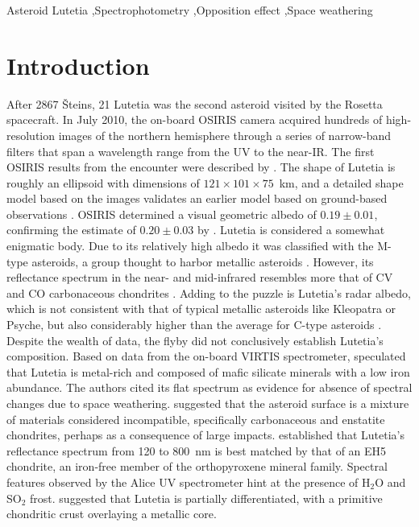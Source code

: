 \documentclass[3p,authoryear]{elsarticle}
\begin{document}
\begin{frontmatter}
\begin{abstract}
\end{abstract}

\begin{keyword}
Asteroid Lutetia \sep Spectrophotometry \sep Opposition effect \sep Space weathering
\end{keyword}

\end{frontmatter}




\section{Introduction}
\label{sec:introduction}

After 2867 {\v S}teins, 21 Lutetia was the second asteroid visited by the Rosetta spacecraft. In July 2010, the on-board OSIRIS camera \citep{K07} acquired hundreds of high-resolution images of the northern hemisphere through a series of narrow-band filters that span a wavelength range from the UV to the near-IR. The first OSIRIS results from the encounter were described by \citet{S11}. The shape of Lutetia is roughly an ellipsoid with dimensions of $121 \times 101 \times 75$~km, and a detailed shape model based on the images validates an earlier model based on ground-based observations \citep{C12}. OSIRIS determined a visual geometric albedo of $0.19 \pm 0.01$, confirming the estimate of $0.20 \pm 0.03$ by \citet{S08}. Lutetia is considered a somewhat enigmatic body. Due to its relatively high albedo it was classified with the M-type asteroids, a group thought to harbor metallic asteroids \citep{L10,W10}. However, its reflectance spectrum in the near- and mid-infrared resembles more that of CV and CO carbonaceous chondrites \citep{B08,L09,B10}. Adding to the puzzle is Lutetia's radar albedo, which is not consistent with that of typical metallic asteroids like Kleopatra or Psyche, but also considerably higher than the average for C-type asteroids \citep{S08}. Despite the wealth of data, the flyby did not conclusively establish Lutetia's composition. Based on data from the on-board VIRTIS spectrometer, \citet{C11} speculated that Lutetia is metal-rich and composed of mafic silicate minerals with a low iron abundance. The authors cited its flat spectrum as evidence for absence of spectral changes due to space weathering. \citet{B12} suggested that the asteroid surface is a mixture of materials considered incompatible, specifically carbonaceous and enstatite chondrites, perhaps as a consequence of large impacts. \citet{St11} established that Lutetia's reflectance spectrum from 120 to 800~nm is best matched by that of an EH5 chondrite, an iron-free member of the orthopyroxene mineral family. Spectral features observed by the Alice UV spectrometer hint at the presence of H$_2$O and SO$_2$ frost. \citet{W12} suggested that Lutetia is partially differentiated, with a primitive chondritic crust overlaying a metallic core.
\end{document}
